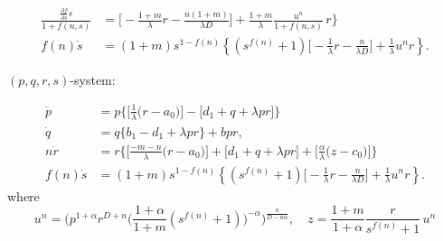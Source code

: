 \documentclass[a4paper,11pt]{article}
\def\tth{{\tilde{\theta}}}
\def\ts{{\tilde{\tau}}}
\def\tu{{\tilde{u}}}
\def\dpp{\dot{p}}
\def\dqq{\dot{q}}
\def\drr{\dot{r}}
\begin{document}
\begin{align*}
 \frac{\frac{\partial f}{\partial s}\dot{s}}{1+f(n,s)} &= \Big[-\frac{1+m}{\lambda }r - \frac{n(1+m)}{\lambda D}\Big] + \frac{1+m}{\lambda}\frac{u^n}{1+f(n,s)}\,r\bigg\}\\
 {f(n)}\dot{s}&=(1+m)s^{1-{f(n)}} \left\{(s^{f(n)}+1) \Big[-\frac{1}{\lambda }r - \frac{n}{\lambda D}\Big] + \frac{1}{\lambda} {u^n}r\right\}.
\end{align*}


$(p,q,r,s)$-system:

\begin{equation}
\begin{aligned}
  {\dpp}&=p\bigg\{\Big[\frac{1}{\lambda }\Big(r-a_0\Big)\Big] -\Big[d_1 + q + \lambda p r\Big]\bigg\}\\
  {\dqq}&=q\bigg\{b_1-d_1 + \lambda p r\bigg\} +bpr,\\
 n{\drr}&=r\bigg\{\Big[\frac{-m-n}{\lambda }\Big(r-a_0\Big)\Big]+\Big[d_1 + q + \lambda p r\Big]+\Big[\frac{\alpha}{\lambda }\Big(z-c_0\Big)\Big]\bigg\}\\
 {f(n)}\dot{s}&=(1+m)s^{1-{f(n)}} \left\{(s^{f(n)}+1) \Big[-\frac{1}{\lambda }r - \frac{n}{\lambda D}\Big] + \frac{1}{\lambda} {u^n}r\right\}.
\end{aligned}
\end{equation}
where $$u^n = \Big(p^{1+\alpha} r^{D+n}\Big( \frac{1+\alpha}{1+m}(s^{f(n)}+1)\Big)^{-\alpha}\Big)^{\frac{n}{D-n\alpha}}, \quad z = \frac{1+m}{1+\alpha} \frac{r}{s^{f(n)}+1}\,u^n$$
\end{document}

